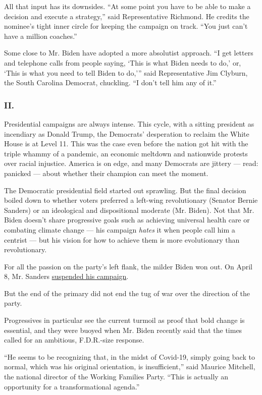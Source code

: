 All that input has its downsides. ``At some point you have to be able to
make a decision and execute a strategy,'' said Representative Richmond.
He credits the nominee's tight inner circle for keeping the campaign on
track. ``You just can't have a million coaches.''

Some close to Mr. Biden have adopted a more absolutist approach. ``I get
letters and telephone calls from people saying, `This is what Biden
needs to do,' or, `This is what you need to tell Biden to do,''' said
Representative Jim Clyburn, the South Carolina Democrat, chuckling. ``I
don't tell him any of it.''

\hypertarget{ii}{%
\subsubsection{II.}\label{ii}}

Presidential campaigns are always intense. This cycle, with a sitting
president as incendiary as Donald Trump, the Democrats' desperation to
reclaim the White House is at Level 11. This was the case even before
the nation got hit with the triple whammy of a pandemic, an economic
meltdown and nationwide protests over racial injustice. America is on
edge, and many Democrats are jittery --- read: panicked --- about
whether their champion can meet the moment.

The Democratic presidential field started out sprawling. But the final
decision boiled down to whether voters preferred a left-wing
revolutionary (Senator Bernie Sanders) or an ideological and
dispositional moderate (Mr. Biden). Not that Mr. Biden doesn't share
progressive goals such as achieving universal health care or combating
climate change --- his campaign \emph{hates} it when people call him a
centrist --- but his vision for how to achieve them is more evolutionary
than revolutionary.

For all the passion on the party's left flank, the milder Biden won out.
On April 8, Mr. Sanders
\href{https://www.nytimes.com/2020/04/08/us/politics/bernie-sanders-drops-out.html}{suspended
his campaign}.

But the end of the primary did not end the tug of war over the direction
of the party.

Progressives in particular see the current turmoil as proof that bold
change is essential, and they were buoyed when Mr. Biden recently said
that the times called for an ambitious, F.D.R.-size response.

``He seems to be recognizing that, in the midst of Covid-19, simply
going back to normal, which was his original orientation, is
insufficient,'' said Maurice Mitchell, the national director of the
Working Families Party. ``This is actually an opportunity for a
transformational agenda.''

